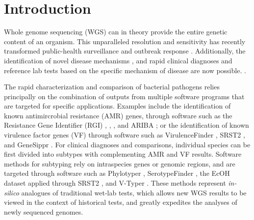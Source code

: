 \documentclass{article}
\begin{document}
\section{Introduction}

Whole genome sequencing (WGS) can in theory provide the entire genetic content of an organism. This unparalleled resolution and sensitivity has recently transformed public-health surveillance and outbreak response \cite{ronholm2016navigating,lytsy2017time}. Additionally, the identification of novel disease mechanisms \cite{wang2014whole,yuen2015whole}, and rapid clinical diagnoses and reference lab tests based on the specific mechanism of disease are now possible. \cite{willig2015whole,dewey2014clinical}.

The rapid characterization and comparison of bacterial pathogens relies principally on the combination of outputs from multiple software programs that are targeted for specific applications. Examples include the identification of known antimircrobial resistance (AMR) genes, through software such as the Resistance Gene Identifier (RGI) \cite{mcarthur2013comprehensive}, \cite{kleinheinz2014applying}, \cite{gupta2014arg}, and ARIBA \cite{hunt2017ariba}; or the identification of known virulence factor genes (VF) through software such as VirulenceFinder \cite{kleinheinz2014applying}, SRST2 \cite{inouye2014srst2}, and GeneSippr \cite{lambert2015genesippr}. For clinical diagnoses and comparisons, individual species can be first divided into subtypes with complementing AMR and VF results. Software methods for subtyping rely on intraspecies genes or genomic regions, and are targeted through software such as Phylotyper \cite{whiteside2017phylotyper}, SerotypeFinder \cite{joensen2015rapid}, the EcOH dataset applied through SRST2 \cite{ingle2016silico}, and V-Typer \cite{carrillo2016comparative}. These methods represent \textit{in-silico} analogues of traditional wet-lab tests, which allows new WGS results to be viewed in the context of historical tests, and greatly expedites the analyses of newly sequenced genomes. 
\end{document}
